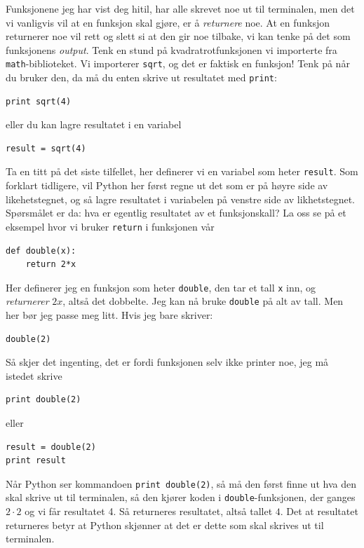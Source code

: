 \documentclass[a4paper, 11pt, notitlepage]{article}
\begin{document}
Funksjonene jeg har vist deg hitil, har alle skrevet noe ut til terminalen, men det vi vanligvis vil at en funksjon skal gjøre, er å \emph{returnere} noe. At en funksjon returnerer noe vil rett og slett si at den gir noe tilbake, vi kan tenke på det som funksjonens \emph{output}. Tenk en stund på kvadratrotfunksjonen vi importerte fra \verb+math+-biblioteket. Vi importerer \verb+sqrt+, og det er faktisk en funksjon! Tenk på når du bruker den, da må du enten skrive ut resultatet med \verb+print+:
\begin{lstlisting}
print sqrt(4)
\end{lstlisting}
eller du kan lagre resultatet i en variabel
\begin{lstlisting}
result = sqrt(4)
\end{lstlisting}
Ta en titt på det siste tilfellet, her definerer vi en variabel som heter \verb+result+. Som forklart tidligere, vil Python her først regne ut det som er på høyre side av likehetstegnet, og så lagre resultatet i variabelen på venstre side av likhetstegnet. Spørsmålet er da: hva er egentlig resultatet av et funksjonskall? La oss se på et eksempel hvor vi bruker \verb+return+ i funksjonen vår
\begin{lstlisting}
def double(x):
	return 2*x
\end{lstlisting}
Her definerer jeg en funksjon som heter \verb+double+, den tar et tall \verb+x+ inn, og \emph{returnerer} $2x$, altså det dobbelte. Jeg kan nå bruke \verb+double+ på alt av tall. Men her bør jeg passe meg litt. Hvis jeg bare skriver:
\begin{lstlisting}
double(2)
\end{lstlisting}
Så skjer det ingenting, det er fordi funksjonen selv ikke printer noe, jeg må istedet skrive 
\begin{lstlisting}
print double(2)
\end{lstlisting}
eller 
\begin{lstlisting}
result = double(2)
print result
\end{lstlisting}

Når Python ser kommandoen \verb+print double(2)+, så må den først finne ut hva den skal skrive ut til terminalen, så den kjører koden i \verb+double+-funksjonen, der ganges $2\cdot2$ og vi får resultatet 4. Så returneres resultatet, altså tallet $4$. Det at resultatet returneres betyr at Python skjønner at det er dette som skal skrives ut til terminalen.
\end{document}
